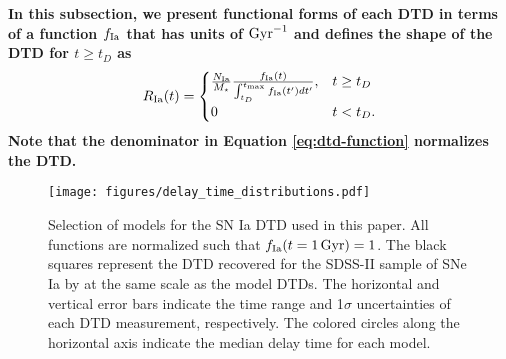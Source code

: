 \documentclass[twocolumn,twocolappendix,linenumbers]{aastex631}
\begin{document}
{\bf In this subsection, we present functional forms of each DTD in terms of a function $f_{\rm Ia}$ that has units of ${\rm Gyr}^{-1}$ and defines the shape of the DTD for $t\ge t_D$ as}
\begin{equation}
    R_{\rm Ia}(t) = 
    \begin{cases}
        \frac{N_{\rm Ia}}{M_\star}
        \frac{f_{\rm Ia}(t)}{\int_{t_D}^{t_{\rm max}} f_{\rm Ia}(t') dt'}, & t \ge t_D \\
        0 & t < t_D.
    \end{cases}
    \label{eq:dtd-function}
\end{equation}
{\bf Note that the denominator in Equation \ref{eq:dtd-function} normalizes the DTD.}

\begin{figure}
    \centering
    \texttt{[image: figures/delay\_time\_distributions.pdf]}
    \caption{Selection of models for the SN Ia DTD used in this paper. All functions are normalized such that $f_{\rm Ia}(t=1\,{\rm Gyr})=1$. The black squares represent the DTD recovered for the SDSS-II sample of SNe Ia by \citet{Maoz2012-SloanIIDTD} at the same scale as the model DTDs. The horizontal and vertical error bars indicate the time range and 1$\sigma$ uncertainties of each DTD measurement, respectively. The colored circles along the horizontal axis indicate the median delay time for each model.}
    \label{fig:dtds}
\end{figure}
\end{document}
